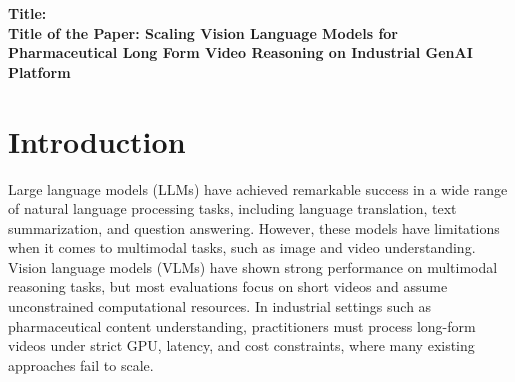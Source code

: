\documentclass{article}
\begin{document}
\begin{titlepage}
\begin{center}
{\large\textbf{Title:}\\}
{\large\textbf{Title of the Paper: Scaling Vision Language Models for Pharmaceutical Long Form Video Reasoning on Industrial GenAI Platform}\\}
\end{center}
\end{titlepage}

\begin{abstract}
Vision Language Models (VLMs) have shown strong performance on multimodal reasoning tasks, yet most evaluations focus on short videos and assume unconstrained computational resources. In industrial settings such as pharmaceutical content understanding, practitioners must process long-form videos under strict GPU, latency, and cost constraints, where many existing approaches fail to scale. In this work, we present an industrial GenAI framework that processes over 200,000 PDFs, 25,326 videos across eight formats (e.g., MP4, M4V, etc.), and 888 multilingual audio files in more than 20 languages. Our study makes three contributions: (i) an industrial large-scale architecture for multimodal reasoning in pharmaceutical domains; (ii) empirical analysis of over 40 VLMs on two leading benchmarks (Video-MME and MMBench) and proprietary dataset of 25,326 videos across 14 disease areas; and (iii) four findings relevant to long-form video reasoning: the role of multimodality, attention mechanism trade-offs, temporal reasoning limits, and challenges of video splitting under GPU constraints. Results show 3-8 times efficiency gains with SDPA attention on commodity GPUs, multimodality improving up to 8/12 task domains (especially length-dependent tasks), and clear bottlenecks in temporal alignment and keyframe detection across open- and closed-source VLMs. Rather than proposing a new "A+B" model, this paper characterizes practical limits, trade-offs, and failure patterns of current VLMs under realistic deployment constraints, and provide actionable guidance for both researchers and practitioners designing scalable multimodal systems for long-form video understanding in industrial domains.
\end{abstract}

\section{Introduction}

Large language models (LLMs) have achieved remarkable success in a wide range of natural language processing tasks, including language translation, text summarization, and question answering. However, these models have limitations when it comes to multimodal tasks, such as image and video understanding. Vision language models (VLMs) have shown strong performance on multimodal reasoning tasks, but most evaluations focus on short videos and assume unconstrained computational resources. In industrial settings such as pharmaceutical content understanding, practitioners must process long-form videos under strict GPU, latency, and cost constraints, where many existing approaches fail to scale.
\end{document}
